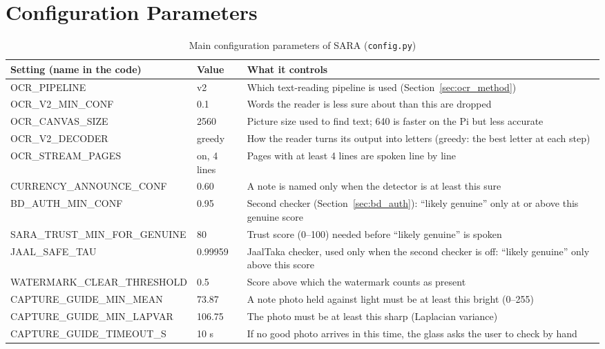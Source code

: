 \clearpage
\section{Configuration Parameters}
\label{app:config}

\begin{table}[H]
\centering
\caption{Main configuration parameters of SARA (\texttt{config.py})}
\label{tab:app_config}
\footnotesize
\begin{tabular}{|L{6.4cm}|C{1.9cm}|L{5.8cm}|}
\hline
\textbf{Setting (name in the code)} & \textbf{Value} & \textbf{What it controls} \\ \hline
OCR\_PIPELINE & v2 & Which text-reading pipeline is used (Section~\ref{sec:ocr_method}) \\ \hline
OCR\_V2\_MIN\_CONF & 0.1 & Words the reader is less sure about than this are dropped \\ \hline
OCR\_CANVAS\_SIZE & 2560 & Picture size used to find text; 640 is faster on the Pi but less accurate \\ \hline
OCR\_V2\_DECODER & greedy & How the reader turns its output into letters (greedy: the best letter at each step) \\ \hline
OCR\_STREAM\_PAGES & on, 4 lines & Pages with at least 4 lines are spoken line by line \\ \hline
CURRENCY\_ANNOUNCE\_CONF & 0.60 & A note is named only when the detector is at least this sure \\ \hline
BD\_AUTH\_MIN\_CONF & 0.95 & Second checker (Section~\ref{sec:bd_auth}): ``likely genuine'' only at or above this genuine score \\ \hline
SARA\_TRUST\_MIN\_FOR\_GENUINE & 80 & Trust score (0--100) needed before ``likely genuine'' is spoken \\ \hline
JAAL\_SAFE\_TAU & 0.99959 & JaalTaka checker, used only when the second checker is off: ``likely genuine'' only above this score \\ \hline
WATERMARK\_CLEAR\_THRESHOLD & 0.5 & Score above which the watermark counts as present \\ \hline
CAPTURE\_GUIDE\_MIN\_MEAN & 73.87 & A note photo held against light must be at least this bright (0--255) \\ \hline
CAPTURE\_GUIDE\_MIN\_LAPVAR & 106.75 & The photo must be at least this sharp (Laplacian variance) \\ \hline
CAPTURE\_GUIDE\_TIMEOUT\_S & 10 s & If no good photo arrives in this time, the glass asks the user to check by hand \\ \hline

\end{tabular}
\end{table}
